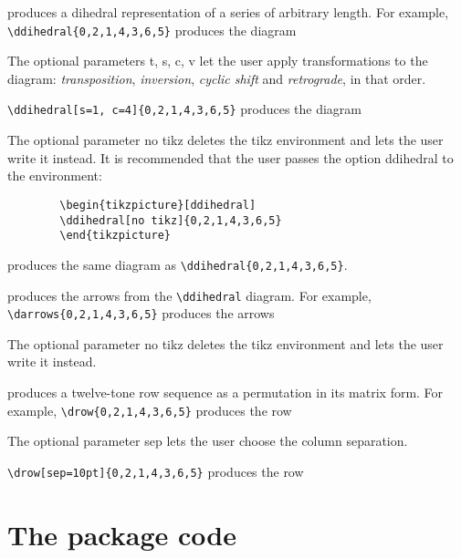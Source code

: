 \documentclass{article}
\begin{document}
\begin{itemize}
		 produces a dihedral representation of a series of arbitrary length. For example, \verb|\ddihedral{0,2,1,4,3,6,5}| produces the diagram\\
		
		The optional parameters \textsf{t, s, c, v} let the user apply transformations to the diagram: \textit{transposition}, \textit{inversion}, \textit{cyclic shift} and \textit{retrograde}, in that order.
		
		\verb|\ddihedral[s=1, c=4]{0,2,1,4,3,6,5}| produces the diagram\\
		
		The optional parameter \textsf{no tikz} deletes the tikz environment and lets the user write it instead. It is recommended that the user passes the option \textsf{ddihedral} to the environment:
		\begin{verbatim}
		\begin{tikzpicture}[ddihedral]
		\ddihedral[no tikz]{0,2,1,4,3,6,5}
		\end{tikzpicture}
		\end{verbatim} produces the same diagram as  \verb|\ddihedral{0,2,1,4,3,6,5}|.		
		
		 produces the arrows from the \verb|\ddihedral| diagram. For example,
 		\verb|\darrows{0,2,1,4,3,6,5}| produces the arrows\\
 		
 		The optional parameter \textsf{no tikz} deletes the tikz environment and lets the user write it instead.
		
		 produces a twelve-tone row sequence as a permutation in its matrix form. For example, \verb|\drow{0,2,1,4,3,6,5}| produces the row
		
		
		The optional parameter \textsf{sep} lets the user choose the column separation.
		
		\verb|\drow[sep=10pt]{0,2,1,4,3,6,5}| produces the row
		
		
	\end{itemize}
	
	\section{The package code}	
	\lstset{
		language=[Latex]Tex,
		basicstyle=\footnotesize\sffamily,
		keywordstyle=\footnotesize\sffamily,
		identifierstyle=\footnotesize\sffamily,
		commentstyle=\footnotesize\sffamily,
		stringstyle=\footnotesize\sffamily,
		escapechar=¬,
		numberstyle=\footnotesize\sffamily,%
		numbers=left,
		stepnumber=2,
		numbersep=15pt,
		columns=flexible,
		showstringspaces=false,
		tabsize=4,
	}
	
	
\end{document}
